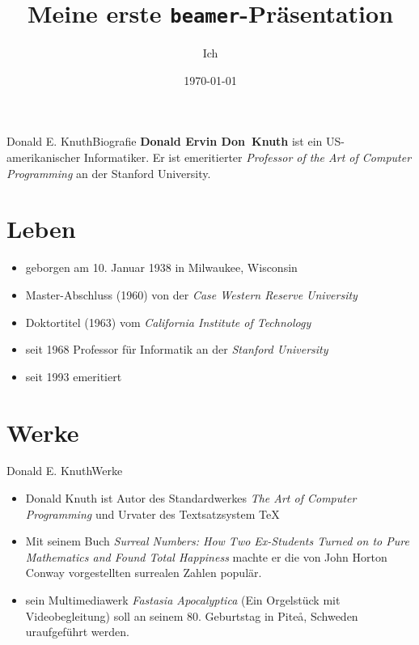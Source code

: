 \documentclass[aspectratio=32]{beamer}
\title{Meine erste \texttt{beamer}-Präsentation}
\author{Ich}
\institute{Friedrich-Schiller-Universität Jena}
\date{\today}
\begin{document}
\tableofcontents
\begin{frame} \titlepage \end{frame}


\begin{frame}{Donald E. Knuth}{Biografie}
	\textbf{Donald Ervin \glqq Don\grqq\ Knuth} ist ein US-amerikanischer Informatiker. Er ist emeritierter \textit{Professor of the Art of Computer Programming} an der Stanford University.
\section{Leben}	
\begin{itemize}[<+->]
	\item geborgen am 10. Januar 1938 in Milwaukee, Wisconsin
	\item Master-Abschluss (1960) von der \textit{Case Western Reserve University}
	\item Doktortitel (1963) vom \textit{California Institute of Technology} 
	\item seit 1968 Professor für Informatik an der \textit{Stanford University}
	\item seit 1993 emeritiert
	
\end{itemize}
	
	
\end{frame}
\section{Werke}
\begin{frame}{Donald E. Knuth}{Werke}
	\begin{itemize}[<+->]
		\item Donald Knuth ist Autor des Standardwerkes \textit{The Art of Computer Programming} und Urvater des Textsatzsystem \TeX 
		\item Mit seinem Buch \textit{Surreal Numbers: How Two Ex-Students Turned on to Pure Mathematics and Found Total Happiness} machte er die von John Horton Conway vorgestellten surrealen Zahlen populär.
		\item sein Multimediawerk \textit{Fastasia Apocalyptica} (Ein Orgelstück mit Videobegleitung) soll an seinem 80. Geburtstag in Pite\aa, Schweden uraufgeführt werden.
	\end{itemize}
\end{frame}
\end{document}
